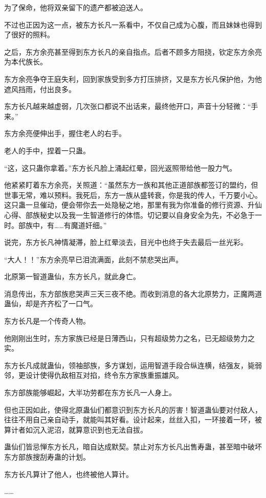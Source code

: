 \begin{this_body}
为了保命，他将双亲留下的遗产都被迫送人。

不过也正因为这一点，被东方长凡一系看中，不仅自己成为心腹，而且妹妹也得到了很好的照料。

之后，东方余亮甚至得到东方长凡的亲自指点。后者不顾多方阻挠，钦定东方余亮为本代族长。

东方余亮争夺王庭失利，回到家族受到多方打压排挤，又是东方长凡保护他，为他遮风挡雨，付出良多。

东方长凡越来越虚弱，几次张口都说不出话来，最终他开口，声音十分轻微：“手来。”

东方余亮便伸出手，握住老人的右手。

老人的手中，捏着一只蛊。

“这，这只蛊你拿着。”东方长凡脸上涌起红晕，回光返照带给他一股力气。

他紧紧盯着东方余亮，关照道：“虽然东方一族和其他正道部族都签订的盟约，但世事无常，难以预料。我死后，东方一族从盛转衰，你是我的传人，千万要小心。这只蛊一旦催动，便会带你去一处隐秘之地，那里有我为你准备的修行资源、升仙心得、部族秘史以及我一生智道修行的体悟。切记要以自身安全为先，不必急于一时。部族中，有……有魔道奸细。”

说完，东方长凡神情凝滞，脸上红晕淡去，目光中也终于失去最后一丝光彩。

“大人！！”东方余亮早已泪流满面，此刻不禁悲哭出声。

北原第一智道蛊仙，东方长凡，就此身亡。

消息传出，东方部族悲哭声三天三夜不绝。而收到消息的各大北原势力，正魔两道蛊仙，却是齐齐松了一口气。

东方长凡是一个传奇人物。

他刚刚出生时，东方家族已经是日薄西山，只有超级势力之名，已无超级势力之实。

东方长凡成就蛊仙，领袖部族，多方谋划，运用智道手段合纵连横，结强友，毙弱邻，更设计使得仇敌相互对掐，终令东方家族重振雄风。

东方部族能够崛起，大半功劳都在东方长凡一人身上。

但也正因如此，使得北原蛊仙们都意识到东方长凡的厉害！智道蛊仙要对付敌人，往往不用自己亲自动手，就能叫其好看。设计起来，丝丝入扣，一环接着一环，被算计者如沉入泥沼，就算意识到也无法自拔。

蛊仙们皆忌惮东方长凡，暗自达成默契。禁止对东方长凡出售寿蛊，甚至暗中破坏东方部族搜刮寿蛊的计划。

东方长凡算计了他人，也终被他人算计。

……


\end{this_body}
